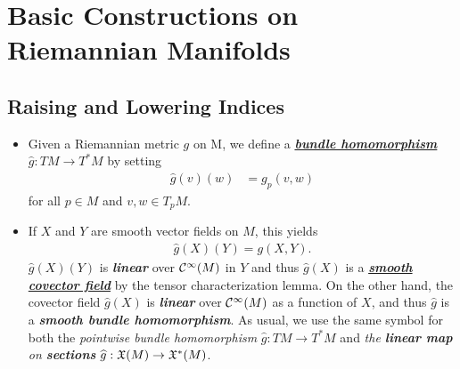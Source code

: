 \documentclass[11pt]{article}
\begin{document}
\section{Basic Constructions on Riemannian Manifolds}
\subsection{Raising and Lowering Indices}
\begin{itemize}
\item
\begin{definition}
Given a Riemannian metric $g$ on M, we define a \underline{\emph{\textbf{bundle homomorphism}}} $\widehat{g}: TM \rightarrow T^{*}M$ by setting
\begin{align*}
\widehat{g}(v)(w) &= g_{p}(v, w)
\end{align*} for all $p \in M$ and $v, w \in T_{p}M$.
\end{definition}

\item \begin{remark}
 If $X$ and $Y$ are smooth vector fields on $M$, this yields
\begin{align*}
\widehat{g}(X)(Y) = g(X, Y).
\end{align*} $\widehat{g}(X)(Y)$ is \emph{\textbf{linear}} over ${\mathcal C}^{\infty}(M)$ in $Y$ and thus \underline{$\widehat{g}(X)$} is a \underline{\emph{\textbf{smooth covector field}}} by the tensor characterization lemma. On the other hand, the covector field $\widehat{g}(X)$ is \emph{\textbf{linear}} over ${\mathcal C}^{\infty}(M)$ as a function of $X$, and thus $\widehat{g}$ is a \emph{\textbf{smooth bundle homomorphism}}. As usual, we use the same symbol for both the \emph{pointwise bundle homomorphism} $\widehat{g}: TM \rightarrow T^{*}M$ and \emph{the \textbf{linear map} on \textbf{sections}} $\widehat{g}: {\mathfrak X}(M) \rightarrow {\mathfrak X}^{*}(M)$.
\end{remark}




\end{itemize}
\end{document}
